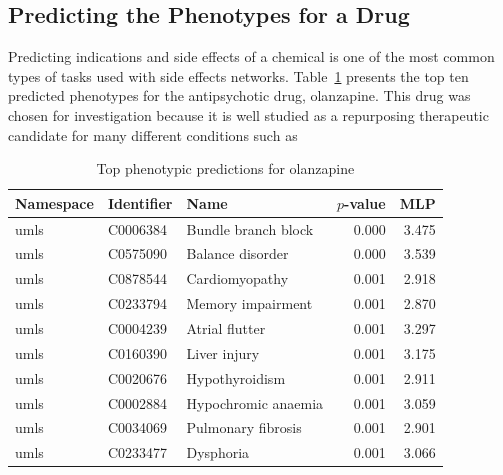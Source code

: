 \subsection{Predicting the Phenotypes for a Drug}

Predicting indications and side effects of a chemical is one of the most common types of tasks used with side effects networks.
Table~\ref{tab:drug_phenotype} presents the top ten predicted phenotypes for the antipsychotic drug, olanzapine. This drug was chosen for investigation because it is well studied as a repurposing therapeutic candidate for many different conditions such as 

\begin{table}[!ht]
    \centering
    \begin{tabular}{|l|l|l|r|r|}
        \hline
        \textbf{Namespace} & \textbf{Identifier} & \textbf{Name} & \textbf{$p$-value} & \textbf{MLP} \\
        \hline
        umls & C0006384 & Bundle branch block & 0.000 & 3.475 \\
        \hline
        umls & C0575090 & Balance disorder & 0.000 & 3.539 \\
        \hline
        umls & C0878544 & Cardiomyopathy & 0.001 & 2.918 \\
        \hline
        umls & C0233794 & Memory impairment & 0.001 & 2.870 \\
        \hline
        umls & C0004239 & Atrial flutter & 0.001 & 3.297 \\
        \hline
        umls & C0160390 & Liver injury & 0.001 & 3.175 \\
        \hline
        umls & C0020676 & Hypothyroidism & 0.001 & 2.911 \\
        \hline
        umls & C0002884 & Hypochromic anaemia & 0.001 & 3.059 \\
        \hline
        umls & C0034069 & Pulmonary fibrosis & 0.001 & 2.901 \\
        \hline
        umls & C0233477 & Dysphoria & 0.001 & 3.066 \\
        \hline
    \end{tabular}
    \caption{Top phenotypic predictions for olanzapine}
    \label{tab:drug_phenotype}
\end{table}

